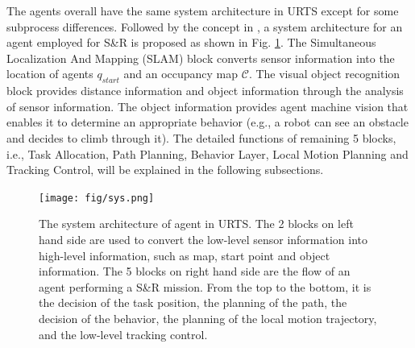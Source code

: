 \documentclass{ieeeaccess}
\begin{document}
The agents overall have the same system architecture in URTS except for some subprocess differences. Followed by the concept in \cite{paden2016survey}, a system architecture for an agent employed for S\&R is proposed as shown in Fig. \ref{fig:sys}. The Simultaneous Localization And Mapping (SLAM) block converts sensor information into the location of agents $q_{start}$ and an occupancy map $\mathcal{C}$. The visual object recognition block provides distance information and object information through the analysis of sensor information. The object information provides agent machine vision that enables it to determine an appropriate behavior (e.g., a robot can see an obstacle and decides to climb through it). The detailed functions of remaining 5 blocks, i.e., Task Allocation, Path Planning, Behavior Layer, Local Motion Planning and Tracking Control, will be explained in the following subsections.


\begin{figure}[htbp]
\centering
\texttt{[image: fig/sys.png]}\caption{The system architecture of agent in URTS. The 2 blocks on left hand side are used to convert the low-level sensor information into high-level information, such as map, start point and object information. The 5 blocks on right hand side are the flow of an agent performing a S\&R mission. From the top to the bottom, it is the decision of the task position, the planning of the path, the decision of the behavior, the planning of the local motion trajectory, and the low-level tracking control.}%
\label{fig:sys}
\end{figure}
\end{document}
